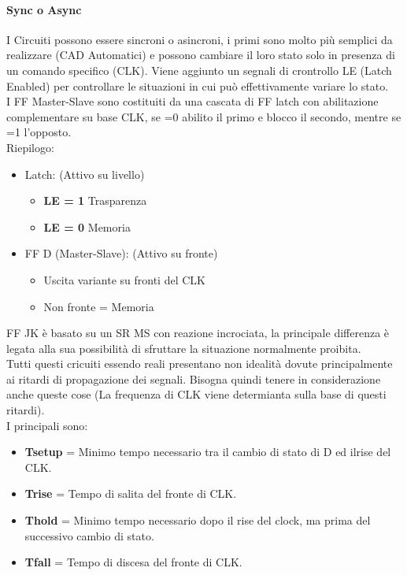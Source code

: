 \documentclass[12pt]{article}
\begin{document}
\paragraph{Sync o Async}
I Circuiti possono essere sincroni o asincroni, i primi sono molto più semplici da realizzare (CAD Automatici) e possono cambiare il loro stato solo in presenza di un comando specifico (CLK). Viene aggiunto un segnali di crontrollo LE (Latch Enabled) per controllare le situazioni in cui può effettivamente variare lo stato.\\
I FF Master-Slave sono costituiti da una cascata di FF latch con abilitazione complementare su base CLK, se =0 abilito il primo e blocco il secondo, mentre se =1 l'opposto.\\
Riepilogo:
\begin{itemize}
  \item Latch: (Attivo su livello)
  \begin{itemize}
    \item \textbf{LE = 1} Trasparenza
    \item \textbf{LE = 0} Memoria
  \end{itemize}
  \item FF D (Master-Slave): (Attivo su fronte)
  \begin{itemize}
    \item Uscita variante su fronti del CLK
    \item Non fronte = Memoria
  \end{itemize}
\end{itemize}
FF JK è basato su un SR MS con reazione incrociata, la principale differenza è legata alla sua possibilità di sfruttare la situazione normalmente proibita.\\
Tutti questi cricuiti essendo reali presentano non idealità dovute principalmente ai ritardi di propagazione dei segnali. Bisogna quindi tenere in considerazione anche queste cose (La frequenza di CLK viene determianta sulla base di questi ritardi).\\
I principali sono:
\begin{itemize}
  \item \textbf{Tsetup} = Minimo tempo necessario tra il cambio di stato di D ed ilrise del CLK.
  \item \textbf{Trise} = Tempo di salita del fronte di CLK.
  \item \textbf{Thold} = Minimo tempo necessario dopo il rise del clock, ma prima del successivo cambio di stato.
  \item \textbf{Tfall} = Tempo di discesa del fronte di CLK.
\end{itemize}
\end{document}
